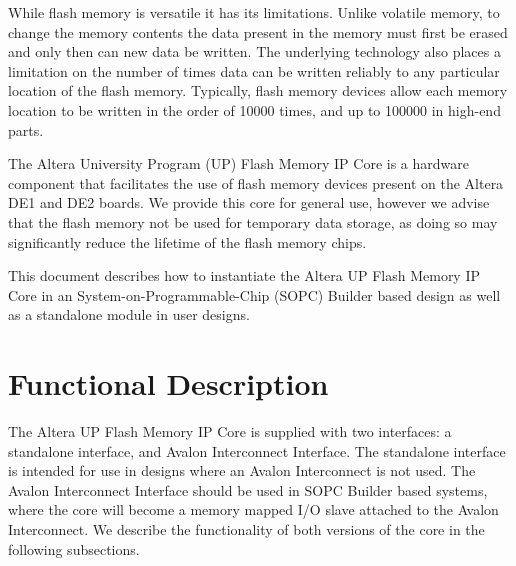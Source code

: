 While flash memory is versatile it has its limitations. Unlike volatile memory, to change the memory contents
the data present in the memory must first be erased and only then can new data be written. The underlying technology also
places a limitation on the number of times data can be written reliably to any particular location of the flash memory. Typically,
flash memory devices allow each memory location to be written in the order of 10000 times, and up to 100000 in high-end
parts.

The Altera University Program (UP) Flash Memory IP Core is a hardware component that facilitates the use of flash memory devices
present on the Altera DE1 and DE2 boards. We provide this core for general use, however we advise that the flash memory
not be used for temporary data storage, as doing so may significantly reduce the lifetime of
the flash memory chips.

This document describes how to instantiate the Altera UP Flash Memory IP Core in an
System-on-Programmable-Chip (SOPC) Builder based design as well as a standalone module in user designs.

\section{Functional Description}

The Altera UP Flash Memory IP Core is supplied with two interfaces: a standalone interface, and Avalon Interconnect Interface. The standalone interface is
intended for use in designs where an Avalon Interconnect is not used. The Avalon Interconnect Interface should be used in SOPC Builder based systems, where the core will become a memory mapped I/O slave attached to the Avalon Interconnect. We describe the functionality of both versions of the core in the following subsections.

